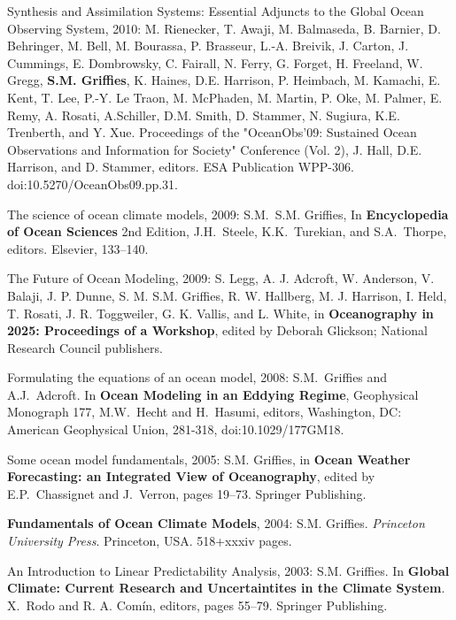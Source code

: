 \begin{etaremune}
\item Synthesis and Assimilation Systems: Essential Adjuncts to the
  Global Ocean Observing System, 2010: M. Rienecker, T. Awaji,
  M. Balmaseda, B. Barnier, D. Behringer, M. Bell, M. Bourassa,
  P. Brasseur, L.-A. Breivik, J. Carton, J. Cummings, E. Dombrowsky,
  C. Fairall, N. Ferry, G. Forget, H. Freeland, W. Gregg, {\bf
    S.M. Grif\/f\/ies}, K. Haines, D.E. Harrison, P. Heimbach,
  M. Kamachi, E. Kent, T. Lee, P.-Y. {Le Traon}, M. McPhaden,
  M. Martin, P. Oke, M. Palmer, E. Remy, A. Rosati, A.Schiller,
  D.M. Smith, D. Stammer, N. Sugiura, K.E. Trenberth, and Y. Xue.
  Proceedings of the "OceanObs’09: Sustained Ocean Observations and
  Information for Society" Conference (Vol. 2), J. Hall,
  D.E. Harrison, and D. Stammer, editors. ESA Publication WPP-306.
  doi:10.5270/OceanObs09.pp.31.

\item The science of ocean climate models, 2009: S.M.\ S.M. Grif\/f\/ies,  In {\bf Encyclopedia of Ocean Sciences} 2nd Edition,  J.H.\ Steele, K.K.\ Turekian, and S.A.\ Thorpe, editors. Elsevier, 133--140.

\item The Future of Ocean Modeling, 2009: S. Legg, A. J. Adcroft, W.   Anderson, V. Balaji, J. P. Dunne, S. M. S.M. Grif\/f\/ies, R. W. Hallberg, M. J. Harrison, I. Held, T. Rosati, J. R. Toggweiler, G. K. Vallis, and L.  White, in {\bf Oceanography in 2025: Proceedings of a Workshop}, edited by Deborah Glickson; National Research Council publishers.  

\item Formulating the equations of an ocean model, 2008: S.M.\ Grif\/f\/ies and A.J.\ Adcroft. In {\bf Ocean Modeling in an Eddying Regime}, Geophysical Monograph 177, M.W.\ Hecht and H.\ Hasumi, editors, Washington, DC: American Geophysical Union, 281-318, doi:10.1029/177GM18. 

\item Some ocean model fundamentals, 2005: S.M. Grif\/f\/ies, in {\bf Ocean Weather Forecasting: an Integrated View of Oceanography}, edited
by E.P.\ Chassignet and J.\ Verron, pages 19--73.  Springer Publishing.

\item {\bf Fundamentals of Ocean Climate Models}, 2004: S.M. Grif\/f\/ies. {\em Princeton University Press}. Princeton, USA.  518+xxxiv pages.

\item An Introduction to Linear Predictability Analysis, 2003: S.M. Grif\/f\/ies.  In {\bf Global Climate: Current Research and Uncertaintites in the Climate System}. X.\ Rodo and R. A. Com\'in, editors, pages 55--79.  Springer Publishing.


\end{etaremune}
